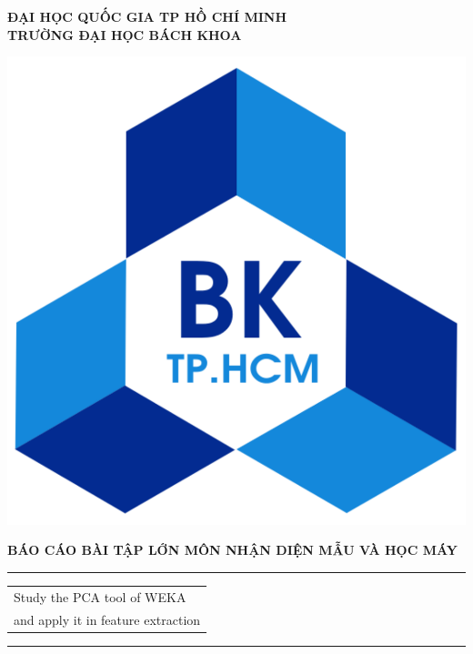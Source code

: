 \documentclass{hcmutarticle}
\begin{document}
\thispagestyle{empty}
\begin{center}
\LARGE\bfseries ĐẠI HỌC QUỐC GIA TP HỒ CHÍ MINH \\
TRƯỜNG ĐẠI HỌC BÁCH KHOA
\end{center}

\begin{center}
\includegraphics[scale=0.2]{hcmut.pdf}\\[1cm]
\end{center}

\vspace{1cm}

\begin{center}
\Large \bfseries BÁO CÁO BÀI TẬP LỚN MÔN NHẬN DIỆN MẪU VÀ HỌC MÁY\\[0.5cm]
\end{center}
\rule{\textwidth}{1pt}
\vspace{2pt}
\begin{center}
\Huge
\begin{tabular}{@{}l}
Study the PCA tool of WEKA \\
and apply it in feature extraction\\[6pt]
\end{tabular}
\end{center}
\rule{\textwidth}{1pt}\\[1cm]
\end{document}
